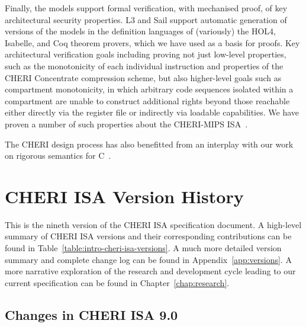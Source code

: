 Finally, the models support formal verification, with mechanised
proof, of key architectural security properties.
L3 and Sail support automatic generation of versions of the models in
the definition languages of (variously) the
HOL4, Isabelle, and Coq theorem provers, which we have used as a basis
for proofs.
Key architectural verification goals including proving not just low-level
properties, such as the monotonicity of each individual instruction
and properties of the CHERI Concentrate compression scheme, but also
higher-level goals such as compartment monotonicity, in which arbitrary code
sequences isolated within a compartment are unable to construct additional
rights beyond those reachable either directly via the register file or
indirectly via loadable capabilities.
We have proven a number of such properties about the CHERI-MIPS ISA~\cite{cheri-formal-SP2020,UCAM-CL-TR-940}.

The CHERI design process has also benefitted from an interplay with
our work on rigorous semantics for C~\cite{Cerberus-PLDI16,cerberus-popl2019}.


\section{CHERI ISA Version History}


\begin{table}[th!]
\begin{center}
\caption{CHERI ISA revisions and major development phases}

\end{center}
\label{table:intro-cheri-isa-versions}
\end{table}

This is the nineth version of the CHERI ISA specification document.
A high-level summary of CHERI ISA versions and their corresponding
contributions can be found in Table~\ref{table:intro-cheri-isa-versions}.
A much more detailed version summary and complete change log can be found in
Appendix~\ref{app:versions}.
A more narrative exploration of the research and development cycle leading to
our current specification can be found in Chapter~\ref{chap:research}.

\subsection{Changes in CHERI ISA 9.0}

